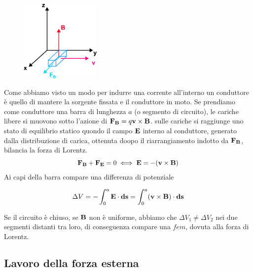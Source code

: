 \begin{figure} %
    \centering
    \includegraphics[width=0.35\textwidth]{images/barra.png} %
\end{figure}
Come abbiamo visto un modo per indurre una corrente all'interno un conduttore \`e  quello di mantere la sorgente fissata e il conduttore in moto. Se prendiamo come conduttore una barra di lunghezza $a$ (o segmento di circuito), le cariche libere si muovono sotto l'azione di $\bold{F_B} = q \bold{v} \times \bold{B}$.
sulle cariche si raggiunge uno stato di equilibrio statico quondo il campo $\bold{E}$ interno al conduttore, generato dalla distribuzione di carica, ottenuta doopo il riarrangiamento indotto da $\bold{F_B}$, bilancia la forza di Lorentz.
\begin{equation*}
	\bold{F_B} + \bold{F_E} = 0 \iff \bold{E} = - (\bold{v} \times \bold{B})
\end{equation*}  
Ai capi della barra compare una differenza di potenziale

\begin{equation*}
	\Delta V  = - \int_{0}^{a} \bold{E} \cdot \bold{ds} = \int_0^{a}(\bold{v} \times \bold{B}) \cdot \bold{ds}
\end{equation*}

Se il circuito \`e chiuso, se $\bold{B}$ non \`e uniforme, abbiamo che $\Delta V_1 \neq \Delta V_2$ nei due segmenti distanti tra loro, di conseguenza compare una $fem$, dovuta alla forza di Lorentz.

\subsection{Lavoro della forza esterna }

